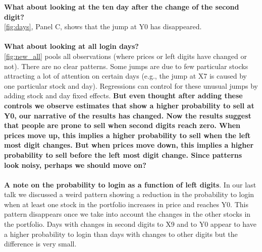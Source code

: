 \documentclass[
	USenglish,12pt,paper=a4,numbers=noenddot,abstract=on,
	final,%
	fullsample,
    ]{scrartcl}
\begin{document}
\textbf{What about looking at the ten day after the change of the second digit?} \\
\ref{fig:days}, Panel C, shows that the jump at Y0 has disappeared.
\\ \\
\textbf{What about looking at all login days?} \\
 \ref{fig:new_all} pools all observations (where prices or left digits have changed or not). There are no clear patterns. Some jumps are due to few particular stocks attracting a lot of attention on certain days (e.g., the jump at X7 is caused by one particular stock and day). Regressions can control for these unusual jumps by adding stock and day fixed effects. \textbf{But even thought after adding these controls we observe estimates that show a higher probability to sell at Y0, our narrative of the results has changed. Now the results suggest that people are prone to sell when second digits reach zero. When prices move up, this implies a higher probability to sell when the left most digit changes. But when prices move down, this implies a higher probability to sell before the left most digit change. Since patterns look noisy, perhaps we should move on?}
  \\ \\
\textbf{A note on the probability to login as a function of left digits}.
In our last talk we discussed a weird pattern showing a reduction in the probability to login when at least one stock in the portfolio increases in price and reaches Y0. This pattern disappears once we take into account the changes in the other stocks in the portfolio. Days with changes in second digits to X9 and to Y0 appear to have a higher probability to login than days with changes to other digits but the difference is very small.

\clearpage
\end{document}
